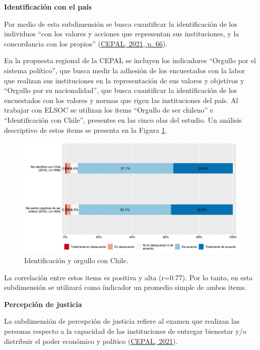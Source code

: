 \documentclass[
  12pt,
]{book}
\begin{document}
\textbf{Identificación con el país}

Por medio de esta subdimensión se busca cuantificar la identificación de los individuos ``con los valores y acciones que representan sus instituciones, y la concordancia con los propios'' (\protect\hyperlink{ref-cepal_cohesion_2021}{CEPAL, 2021, p. 66}).

En la propuesta regional de la CEPAL se incluyen los indicadores ``Orgullo por el sistema político'', que busca medir la adhesión de los encuestados con la labor que realizan sus instituciones en la representación de sus valores y objetivos y ``Orgullo por su nacionalidad'', que busca cuantificar la identificación de los encuestados con los valores y normas que rigen las instituciones del país. Al trabajar con ELSOC se utilizan los items ``Orgullo de ser chileno'' e ``Identificación con Chile'', presentes en las cinco olas del estudio. Un análisis descriptivo de estos items se presenta en la Figura \ref{fig:identificacion}.

\begin{figure}[H]

{\centering \includegraphics[width=1\linewidth,height=1\textheight]{output/graphs/identificacion} 

}

\caption{Identificación y orgullo con Chile.}\label{fig:identificacion}
\end{figure}

La correlación entre estos items es positiva y alta (r=0.77). Por lo tanto, en esta subdimensión se utilizará como índicador un promedio simple de ambos items.

\textbf{Percepción de justicia}

La subdimensión de percepción de justicia refiere al examen que realizan las personas respecto a la capacidad de las instituciones de entregar bienestar y/o distribuir el poder económico y político (\protect\hyperlink{ref-cepal_cohesion_2021}{CEPAL, 2021}).
\end{document}
